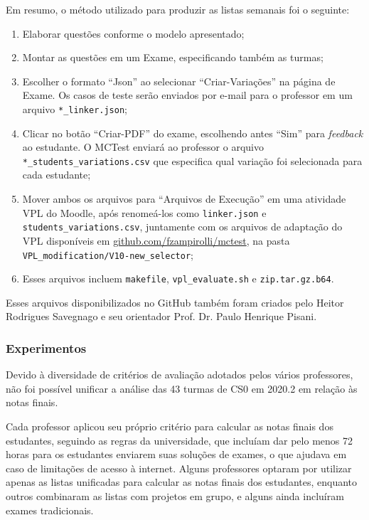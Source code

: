 Em resumo, o método utilizado para produzir as listas semanais foi o seguinte:

\begin{enumerate}
    \item Elaborar questões conforme o modelo apresentado;
    \item Montar as questões em um Exame, especificando também as turmas;
    \item Escolher o formato ``Json'' ao selecionar ``Criar-Variações'' na página de Exame. Os casos de teste serão enviados por e-mail para o professor em um arquivo \verb|*_linker.json|;
    \item Clicar no botão ``Criar-PDF'' do exame, escolhendo antes ``Sim'' para \textit{feedback} ao estudante. O MCTest enviará ao professor o arquivo \verb|*_students_variations.csv| que especifica qual variação foi selecionada para cada estudante;
    \item Mover ambos os arquivos para ``Arquivos de Execução'' em uma atividade VPL do Moodle, após renomeá-los como \verb|linker.json| e \verb|students_variations.csv|, juntamente com os arquivos de adaptação do VPL disponíveis em \href{https://github.com/fzampirolli/mctest}{github.com/fzampirolli/mctest}, na pasta \verb|VPL_modification/V10-new_selector|;
    \item Esses arquivos incluem \verb|makefile|, \verb|vpl_evaluate.sh| e \verb|zip.tar.gz.b64|.
\end{enumerate}

Esses arquivos disponibilizados no GitHub também foram criados pelo Heitor Rodrigues Savegnago e seu orientador Prof. Dr. Paulo Henrique Pisani.

\subsubsection{Experimentos}

Devido à diversidade de critérios de avaliação adotados pelos vários professores, não foi possível unificar a análise das 43 turmas de CS0 em 2020.2 em relação às notas finais.

Cada professor aplicou seu próprio critério para calcular as notas finais dos estudantes, seguindo as regras da universidade, que incluíam dar pelo menos 72 horas para os estudantes enviarem suas soluções de exames, o que ajudava em caso de limitações de acesso à internet. Alguns professores optaram por utilizar apenas as listas unificadas para calcular as notas finais dos estudantes, enquanto outros combinaram as listas com projetos em grupo, e alguns ainda incluíram exames tradicionais.

